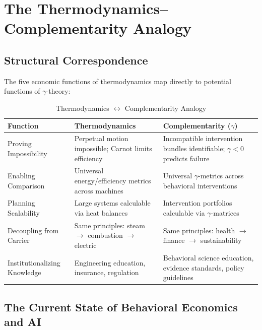 \section{The Thermodynamics--Complementarity Analogy}
\label{sec:thermo-analogy}

\subsection{Structural Correspondence}

The five economic functions of thermodynamics map directly to potential
functions of $\gamma$-theory:

\begin{table}[htbp]
\centering
\caption{Thermodynamics $\leftrightarrow$ Complementarity Analogy}
\label{tab:thermo-gamma-analogy}
\renewcommand{\arraystretch}{1.5}
\begin{tabular}{@{}p{3cm}p{5cm}p{5cm}@{}}
\toprule
\textbf{Function} & \textbf{Thermodynamics} & \textbf{Complementarity ($\gamma$)} \\
\midrule
Proving Impossibility &
Perpetual motion impossible; Carnot limits efficiency &
Incompatible intervention bundles identifiable; $\gamma < 0$ predicts failure \\
\addlinespace
Enabling Comparison &
Universal energy/efficiency metrics across machines &
Universal $\gamma$-metrics across behavioral interventions \\
\addlinespace
Planning Scalability &
Large systems calculable via heat balances &
Intervention portfolios calculable via $\gamma$-matrices \\
\addlinespace
Decoupling from Carrier &
Same principles: steam $\to$ combustion $\to$ electric &
Same principles: health $\to$ finance $\to$ sustainability \\
\addlinespace
Institutionalizing Knowledge &
Engineering education, insurance, regulation &
Behavioral science education, evidence standards, policy guidelines \\
\bottomrule
\end{tabular}
\end{table}

\subsection{The Current State of Behavioral Economics and AI}

